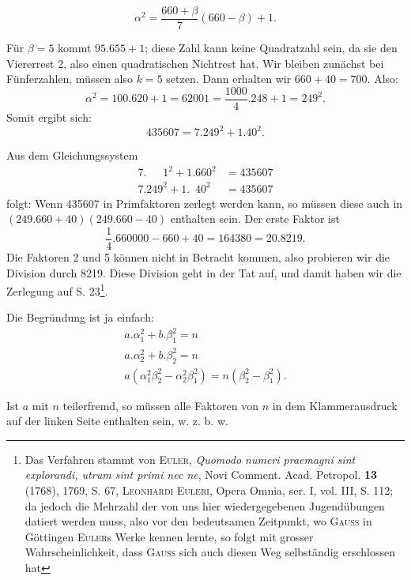 \[
\alpha^2=\frac{660+\beta}{7}(660-\beta)+1.
\]
\par\noindent\hspace*{\parindent}Für $\beta=5$ kommt $95\mathord{.}655+1$; diese Zahl kann keine Quadratzahl sein,
da sie den Viererrest 2, also einen quadratischen Nichtrest hat. Wir bleiben
zunächst bei Fünferzahlen, müssen also $k=5$ setzen. Dann erhalten wir
$660+40=700$. Also:
\[
\alpha^2=100\mathord{.}620+1=62001=\frac{1000}{4}\mathord{.}248+1=249^2.
\]
\noindent Somit ergibt sich:
\[
435607=7\mathord{.}249^2+1\mathord{.}40^2.
\]
\par\noindent\hspace*{\parindent}Aus dem Gleichungssystem
\[
\begin{aligned}
7\mathord{.}\phantom{249}1^2+1\mathord{.}660^2&=435607\\
7\mathord{.}249^2+1\mathord{.}\phantom{6}40^2&=435607
\end{aligned}
\]
\noindent folgt: Wenn 435607 in Primfaktoren zerlegt werden kann, so müssen diese
auch in $(249\mathord{.}660+40)(249\mathord{.}660-40)$ enthalten sein. Der erste Faktor ist
\[
\frac14\mathord{.}660000-660+40=164380=20\mathord{.}8219.
\]
\clearpage{}
\setcounter{footnote}{0}
\noindent Die Faktoren 2 und 5 können nicht in Betracht kommen, also probieren wir
die Division durch 8219. Diese Division geht in der Tat auf, und damit
haben wir die Zerlegung auf S. 23\footnote{Das Verfahren stammt von \textsc{Euler}, \textit{Quomodo numeri praemagni sint explorandi, utrum sint primi nec ne}, Novi Comment. Acad. Petropol. \textbf{13} (1768), 1769, S. 67, \textsc{Leonhardi Euleri}, Opera Omnia, ser. I, vol. III, S. 112; da jedoch die Mehrzahl der von uns hier wiedergegebenen Jugendübungen  datiert werden muss, also vor den bedeutsamen Zeitpunkt, wo \textsc{Gauss} in Göttingen \textsc{Euler}s Werke kennen lernte, so folgt mit grosser Wahrscheinlichkeit, dass \textsc{Gauss} sich auch diesen Weg selbständig erschlossen hat}.

Die Begründung ist ja einfach:
\[
\begin{array}{c}
a\mathord{.}\alpha_1^2+b\mathord{.}\beta_1^2=n\\
a\mathord{.}\alpha_2^2+b\mathord{.}\beta_2^2=n\\\hline
a(\alpha_1^2\beta_2^2-\alpha_2^2\beta_1^2)=n(\beta_2^2-\beta_1^2).
\end{array}
\]
\par\noindent\hspace*{\parindent}Ist $a$ mit $n$ teilerfremd, so müssen alle Faktoren von $n$ in dem Klammerausdruck auf der linken Seite enthalten sein, w. z. b. w.

